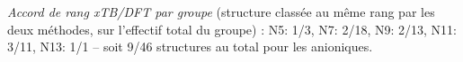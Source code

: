 \noindent\textit{Accord de rang xTB/DFT par groupe} (structure class\'ee au m\^eme rang par les deux m\'ethodes, sur l'effectif total du groupe) : N5: 1/3, N7: 2/18, N9: 2/13, N11: 3/11, N13: 1/1 -- soit 9/46 structures au total pour les anioniques.